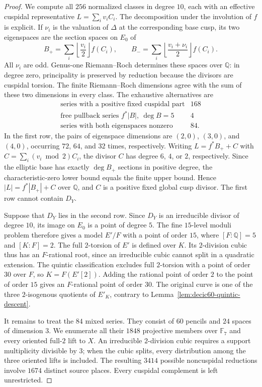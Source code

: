 \begin{proof}
We compute all $256$ normalized classes in degree $10$, each with
an effective cuspidal representative $L=\sum_i v_iC_i$.
The decomposition under the involution of $f$ is explicit.
If $\nu_i$ is the valuation of $\Delta$ at the corresponding base
cusp, its two eigenspaces are the section spaces on $E_0$ of
\[
 B_+=\sum_i\left\lfloor\frac{v_i}{2}\right\rfloor f(C_i),
 \qquad
 B_-=\sum_i\left\lfloor\frac{v_i+\nu_i}{2}\right\rfloor f(C_i).
\]
All $\nu_i$ are odd. Genus-one Riemann--Roch determines these
spaces over $\mathbb Q$: in degree zero, principality is preserved
by reduction because the divisors are cuspidal torsion.
The finite Riemann--Roch dimensions agree with the sum of these
two dimensions in every class. The exhaustive alternatives are
\[
\begin{array}{c|r}
\text{series with a positive fixed cuspidal part}&168\\
\text{free pullback series }f^*|B|,\ \deg B=5&4\\
\text{series with both eigenspaces nonzero}&84.
\end{array}
\]
In the first row, the pairs of eigenspace dimensions are
$(2,0)$, $(3,0)$, and $(4,0)$, occurring $72$, $64$, and $32$
times, respectively. Writing
$L=f^*B_++C$ with $C=\sum_i(v_i\bmod2)C_i$, the divisor $C$
has degree $6$, $4$, or $2$, respectively. Since the elliptic base
has exactly $\deg B_+$ sections in positive degree, the
characteristic-zero lower bound equals the finite upper bound.
Hence $|L|=f^*|B_+|+C$ over $\mathbb Q$, and $C$ is a positive
fixed global cusp divisor. The first row cannot contain $D_Y$.

Suppose that $D_Y$ lies in the second row.
Since $D_Y$ is an irreducible divisor of degree $10$, its image on
$E_0$ is a point of degree $5$. The fine $15$-level moduli problem
therefore gives a model $E'/F$ with a point of order $15$, where
$[F:\mathbb Q]=5$ and $[K:F]=2$.
The full $2$-torsion of $E'$ is defined over $K$.
Its $2$-division cubic thus has an $F$-rational root, since an
irreducible cubic cannot split in a quadratic extension.
The quintic classification excludes full $2$-torsion with a point
of order $30$ over $F$, so $K=F(E'[2])$.
Adding the rational point of order $2$ to the point of order $15$
gives an $F$-rational point of order $30$.
The original curve is one of the three $2$-isogenous quotients of
$E'_K$, contrary to Lemma~\ref{lem:decic60-quintic-descent}.

It remains to treat the $84$ mixed series.
They consist of $60$ pencils and $24$ spaces of dimension $3$.
We enumerate all their $1848$ projective members over $\mathbb F_7$
and every oriented full-$2$ lift to $X$.
An irreducible $2$-division cubic requires a support multiplicity
divisible by $3$; when the cubic splits, every distribution among
the three oriented lifts is included.
The resulting $3414$ possible noncuspidal reductions involve
$1674$ distinct source places. Every cuspidal complement is left
unrestricted.


\end{proof}
